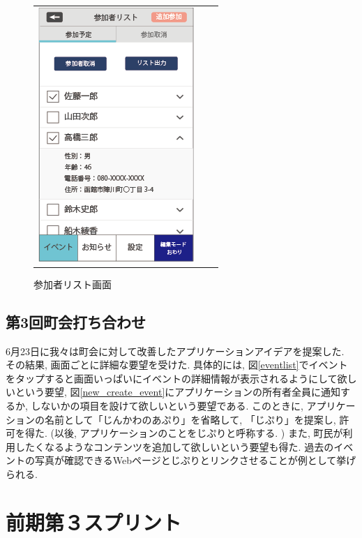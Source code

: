\begin{figure}[h]
\begin{tabular}{ccc}
\begin{minipage}[t]{0.3\hsize}
      \end{minipage}
      \begin{minipage}[t]{0.3\hsize}
        \centering
        \includegraphics[keepaspectratio, scale=0.5]{process_figures/joinlist.png}
        \caption{参加者リスト画面}
        \label{joinedlist}
      \end{minipage}
    \end{tabular}
\end{figure}

\subsection{第3回町会打ち合わせ}
6月23日に我々は町会に対して改善したアプリケーションアイデアを提案した.
その結果, 画面ごとに詳細な要望を受けた.
具体的には, 図\ref{eventlist}でイベントをタップすると画面いっぱいにイベントの詳細情報が表示されるようにして欲しいという要望,
図\ref{new_create_event}にアプリケーションの所有者全員に通知するか, しないかの項目を設けて欲しいという要望である.
このときに, アプリケーションの名前として「じんかわのあぷり」を省略して, 「じぷり」を提案し, 許可を得た. (以後, アプリケーションのことをじぷりと呼称する. )
また, 町民が利用したくなるようなコンテンツを追加して欲しいという要望も得た.
過去のイベントの写真が確認できるWebページとじぷりとリンクさせることが例として挙げられる.

\section{前期第３スプリント}

